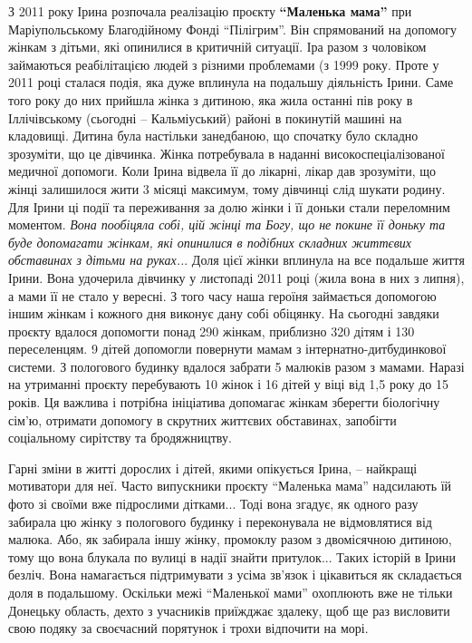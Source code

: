 З 2011 року Ірина розпочала реалізацію проєкту \textbf{\enquote{Маленька мама}} при
Маріупольському Благодійному Фонді \enquote{Пілігрим}. Він спрямований на допомогу
жінкам з дітьми, які опинилися в критичній ситуації. Іра разом з чоловіком
займаються реабілітацією людей з різними проблемами (з 1999 року. Проте у 2011
році сталася подія, яка дуже вплинула на подальшу діяльність Ірини. Саме того
року до них прийшла жінка з дитиною, яка жила останні пів року в Іллічівському
(сьогодні – Кальміуський) районі в покинутій машині на кладовищі. Дитина була
настільки занедбаною, що спочатку було складно зрозуміти, що це дівчинка. Жінка
потребувала в наданні високоспеціалізованої медичної допомоги. Коли Ірина
відвела її до лікарні, лікар дав зрозуміти, що жінці залишилося жити 3 місяці
максимум, тому дівчинці слід шукати родину. Для Ірини ці події та переживання
за долю жінки і її доньки стали переломним моментом. \emph{Вона пообіцяла собі, цій
жінці та Богу, що не покине її доньку та буде допомагати жінкам, які опинилися
в подібних складних життєвих обставинах з дітьми на руках..}. Доля цієї жінки
вплинула на все подальше життя Ірини. Вона удочерила дівчинку у листопаді 2011
році (жила вона в них з липня), а мами її не стало у вересні. З того часу наша
героїня займається допомогою іншим жінкам і кожного дня виконує дану собі
обіцянку. На сьогодні завдяки проєкту вдалося допомогти понад 290 жінкам,
приблизно 320 дітям і 130 переселенцям. 9 дітей допомогли повернути мамам з
інтернатно-дитбудинкової системи. З пологового будинку вдалося забрати 5
малюків разом з мамами. Наразі на утриманні проєкту перебувають 10 жінок і 16
дітей у віці від 1,5 року до 15 років. Ця важлива і потрібна ініціатива
допомагає жінкам зберегти біологічну сім'ю, отримати допомогу в скрутних
життєвих обставинах, запобігти соціальному сирітству та бродяжництву.


Гарні зміни в житті дорослих і дітей, якими опікується Ірина, – найкращі
мотиватори для неї. Часто випускники проєкту \enquote{Маленька мама} надсилають їй фото
зі своїми вже підрослими дітками... Тоді вона згадує, як одного разу забирала цю
жінку з пологового будинку і переконувала не відмовлятися від малюка. Або, як
забирала іншу жінку, промоклу разом з двомісячною дитиною, тому що вона блукала
по вулиці в надії знайти притулок... Таких історій в Ірини безліч. Вона
намагається підтримувати з усіма зв'язок і цікавиться як складається доля в
подальшому. Оскільки межі \enquote{Маленької мами} охоплюють вже не тільки Донецьку
область, дехто з учасників приїжджає здалеку, щоб ще раз висловити свою подяку
за своєчасний порятунок і трохи відпочити на морі.

